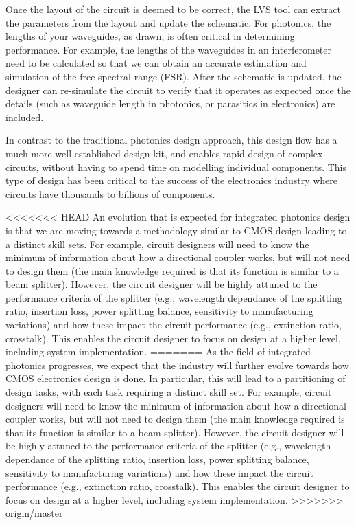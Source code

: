 \documentclass[journal]{spie}
\begin{document}
Once the layout of the circuit is deemed to be correct, the LVS tool can extract the parameters from the layout and update the schematic.  For photonics, the lengths of your waveguides, as drawn, is often critical in determining performance.  For example, the lengths of the waveguides in an interferometer need to be calculated so that we can obtain an accurate estimation and simulation of the free spectral range (FSR). After the schematic is updated, the designer can re-simulate the circuit to verify that it operates as expected once the details (such as waveguide length in photonics, or parasitics in electronics) are included.


In contrast to the traditional photonics design approach, this design flow has a much more well established design kit, and enables rapid design of complex circuits, without having to spend time on modelling individual components.  This type of design has been critical to the success of the electronics industry where circuits have thousands to billions of components.

<<<<<<< HEAD
An evolution that is expected for integrated photonics design is that we are moving towards a methodology similar to CMOS design leading to a distinct skill sets.  For example, circuit designers will need to know the minimum of information about how a directional coupler works, but will not need to design them (the main knowledge required is that its function is similar to a beam splitter).  However, the circuit designer will be highly attuned to the performance criteria of the splitter (e.g., wavelength dependance of the splitting ratio, insertion loss, power splitting balance, sensitivity to manufacturing variations) and how these impact the circuit performance (e.g., extinction ratio, crosstalk).  This enables the circuit designer to focus on design at a higher level, including system implementation.
=======
As the field of integrated photonics progresses, we expect that the industry will further evolve towards how CMOS electronics design is done.  In particular, this will lead to a partitioning of design tasks, with each task requiring a distinct skill set.
For example, circuit designers will need to know the minimum of information about how a directional coupler works, but will not need to design them (the main knowledge required is that its function is similar to a beam splitter).  However, the circuit designer will be highly attuned to the performance criteria of the splitter (e.g., wavelength dependance of the splitting ratio, insertion loss, power splitting balance, sensitivity to manufacturing variations) and how these impact the circuit performance (e.g., extinction ratio, crosstalk).  This enables the circuit designer to focus on design at a higher level, including system implementation.
>>>>>>> origin/master
\end{document}
